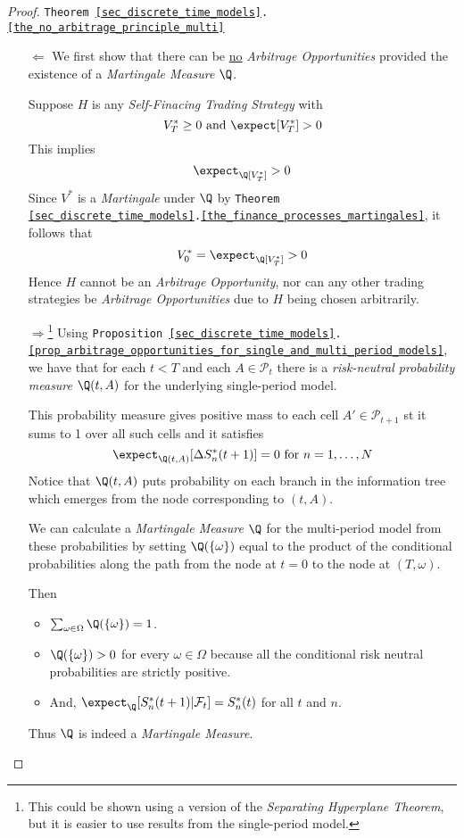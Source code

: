 \documentclass[11pt,a4paper]{article}
\begin{document}
  \begin{proof}{\texttt{Theorem \ref{sec_discrete_time_models}.\ref{the_no_arbitrage_principle_multi}}}
    \begin{itemize}
      \item[$\Longleftarrow$] We first show that there can be \underline{no} \textit{Arbitrage Opportunities} provided the existence of a \textit{Martingale Measure} $\Q$.
      \par Suppose $H$ is any \textit{Self-Finacing Trading Strategy} with
      \[ V_T^*\geq0\text{ and }\expect[V_T^*]>0 \]
      This implies
      \[ \expect_\Q[V_T^*]>0 \]
      Since $V^*$ is a \textit{Martingale} under $\Q$ by \texttt{Theorem \ref{sec_discrete_time_models}.\ref{the_finance_processes_martingales}}, it follows that
      \[ V_0^*=\expect_\Q[V_T^*]>0 \]
      Hence $H$ cannot be an \textit{Arbitrage Opportunity}, nor can any other trading strategies be \textit{Arbitrage Opportunities} due to $H$ being chosen arbitrarily.

      \item[$\Longrightarrow$\footnote{This could be shown using a version of the \textit{Separating Hyperplane Theorem}, but it is easier to use results from the single-period model.}] Using \texttt{Proposition \ref{sec_discrete_time_models}.\ref{prop_arbitrage_opportunities_for_single_and_multi_period_models}}, we have that for each $t<T$ and each $A\in\mathcal{P}_t$ there is a \textit{risk-neutral probability measure} $\Q(t,A)$ for the underlying single-period model.
      \par This probability measure gives positive mass to each cell $A'\in\mathcal{P}_{t+1}$ st it sums to 1 over all such cells and it satisfies
      \[ \expect_{\Q(t,A)}[\Delta S_n^*(t+1)]=0\text{ for }n=1,\dots,N \]
      Notice that $\Q(t,A)$ puts probability on each branch in the information tree which emerges from the node corresponding to $(t,A)$.
      \par We can calculate a \textit{Martingale Measure} $\Q$ for the multi-period model from these probabilities by setting $\Q(\{\omega\})$ equal to the product of the conditional probabilities along the path from the node at $t=0$ to the node at $(T,\omega)$.
      \par Then
      \begin{itemize}
        \item $\sum_{\omega\in\Omega}\Q(\{\omega\})=1$.
        \item $\Q(\{\omega\})>0$ for every $\omega\in\Omega$ because all the conditional risk neutral probabilities are strictly positive.
        \item And, $\expect_\Q[S_n^*(t+1)|\mathcal{F}_t]=S_n^*(t)$ for all $t$ and $n$.
      \end{itemize}
      Thus $\Q$ is indeed a \textit{Martingale Measure}.\proved
    \end{itemize}
  \end{proof}
\end{document}
